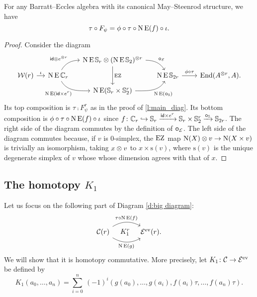 \begin{lemma}\label{l:K0}
	For any Barratt--Eccles algebra with its canonical May--Steenrod structure, we have
	\[
	\tau \mathbin{\circ} F_\psi = \phi \mathbin{\circ} \tau \mathbin{\circ} \operatorname{N}\operatorname{E}(f) \mathbin{\circ} \iota.
	\]
\end{lemma}

\begin{proof}
	Consider the diagram
	\begin{equation*}\label{d:F and f}
		\begin{tikzcd}[column sep=small,row sep=tiny]
			&& \chains\EE\sym_r \ot (\chains\EE\sym_2)^{\ot r}
			\arrow[dr,"\bcomp_{\BE}",out=0,in=120]
			\arrow[dd,"\EZ"] &&[10pt] \\
			\cW(r) \arrow[r,"\iota"] &
			\chains\EE\cyc_r
			\arrow[ur,"\id \ot e^{\ot r}", out=60,in=180]
			\arrow[dr,"\chains\EE(\id \times e^r)"',out=-60,in=180]
			& & \chains\EE\sym_{2r} \arrow[r,"\phi\comp\tau"] &
			\End(A^{\ot r}, A). \\
			&& \chains\EE(\sym_r \times \sym_2^r)
			\arrow[ur, "\chains\EE(\bcomp_{\sym})"', out=0,in=-120]
			&
		\end{tikzcd}
	\end{equation*}
	Its top composition is $\tau \comp F_\psi^r$ as in the proof of \cref{l:main_diag}.
	Its bottom composition is $\phi \mathbin{\circ} \tau \mathbin{\circ} \operatorname{N}\operatorname{E}(f) \mathbin{\circ} \iota$ since $f \colon \mathbb{C}_r \hookrightarrow \mathbb{S}_r \xrightarrow{\mathsf{id} \times e^r} \mathbb{S}_r \times \mathbb{S}_2^r \xrightarrow{\bm{\mathbin{\circ}}_{\mathbb{S}}} \mathbb{S}_{2r}$.
	The right side of the diagram commutes by the definition of $\bm{\mathbin{\circ}}_{\mathcal{E}}$.
	The left side of the diagram commutes because, if $v$ is $0$-simplex, the $\operatorname{EZ}$ map $\operatorname{N}(X) \otimes v \to \operatorname{N}(X \times v)$ is trivially an isomorphism, taking $x \otimes v$ to $x \times \mathrm{s}(v)$, where $\mathrm{s}(v)$ is the unique degenerate simplex of $v$ whose whose dimension agrees with that of $x$.
\end{proof}

\subsection{The homotopy $K_1$}\label{ss:K1}

Let us focus on the following part of Diagram \eqref{d:big diagram}:
\[
\begin{tikzcd}[column sep=large]
	\cC(r)
	\arrow[r,bend left,"\tau \comp \chains\EE(f)"]
	\arrow[r,bend right,"\chains\EE(g)"']
	\arrow[r,phantom,"K_1^r"]
	& \BE^\ev(r).
\end{tikzcd}
\]
We will show that it is homotopy commutative.
More precisely, let $K_1 \colon \mathcal{C} \to \mathcal{E}^{\mathrm{ev}}$ be defined by
\[
K_1(a_0,\dots,a_n) =
\sum_{i=0}^n \ (-1)^i (g(a_0), \dots, g(a_i), f(a_i) \tau, \dots, f(a_n) \tau).
\]

